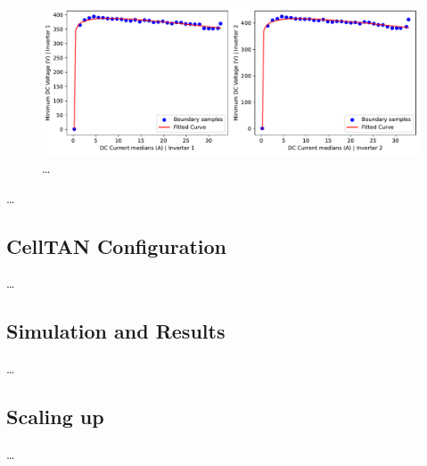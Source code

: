 \begin{figure}[h!]
    \centering
    \includegraphics[width=\textwidth]{figures/chapter5/algorithm/30_boundary.pdf}
    \caption{\dots}
    \label{fig:anomaly_decision_boundary}
\end{figure}

\dots

\subsection{CellTAN Configuration}

\dots

\subsection{Simulation and Results} \label{subsec:results}

\dots

\subsection{Scaling up}

\dots



